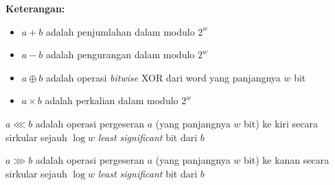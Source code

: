 \documentclass{article}
\begin{document}

\textbf{Keterangan:}

\begin{itemize}
    \item $a + b$ adalah penjumlahan dalam modulo $2^w$
    \item $a - b$ adalah pengurangan dalam modulo $2^w$
    \item $a \oplus b$ adalah operasi \textit{bitwise} XOR dari word yang panjangnya $w$ bit
    \item $a \times b$ adalah perkalian dalam modulo $2^w$
\end{itemize}

$a \lll b$ adalah operasi pergeseran $a$ (yang panjangnya $w$ bit) ke kiri secara sirkular sejauh $\log w$ \textit{least significant} bit dari $b$

\vspace{5mm}

$a \ggg b$ adalah operasi pergeseran $a$ (yang panjangnya $w$ bit) ke kanan secara sirkular sejauh $\log w$ \textit{least significant} bit dari $b$
\end{document}
